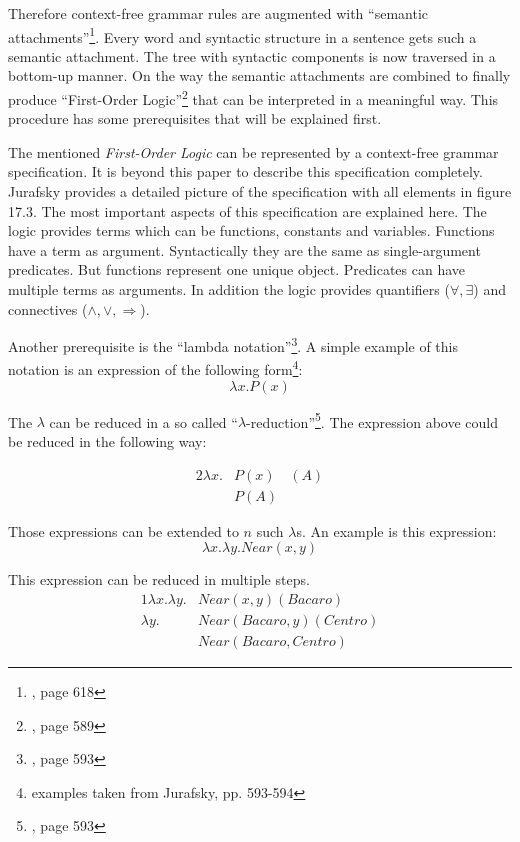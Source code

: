 \documentclass[12pt,twoside]{scrartcl}
\theoremstyle{plain}
\theoremstyle{definition}
\theoremstyle{remark}
\begin{document}
		Therefore context-free grammar rules are augmented with ``semantic attachments''\footnote{\cite{Jurafsky2009}, page 618}. Every word and syntactic structure in a sentence gets such a semantic attachment. The tree with syntactic components is now traversed in a bottom-up manner. On the way the semantic attachments are combined to finally produce ``First-Order Logic''\footnote{\cite{Jurafsky2009a}, page 589} that can be interpreted in a meaningful way. This procedure has some prerequisites that will be explained first.
		
		The mentioned \textit{First-Order Logic} can be represented by a context-free grammar specification. It is beyond this paper to describe this specification completely. Jurafsky\cite{Jurafsky2009a} provides a detailed picture of the specification with all elements in figure 17.3. The most important aspects of this specification are explained here. The logic provides terms which can be functions, constants and variables. Functions have a term as argument. Syntactically they are the same as single-argument predicates. But functions represent one unique object.
		Predicates can have multiple terms as arguments. In addition the logic provides quantifiers ($\forall, \exists$) and connectives ($\wedge, \vee, \Rightarrow$).
		
		Another prerequisite is the ``lambda notation''\footnote{\cite{Jurafsky2009a}, page 593}. A simple example of this notation is an expression of the following form\footnote{examples taken from Jurafsky\cite{Jurafsky2009a}, pp. 593-594}:		
		\[
			\lambda x.P(x)
		\]
		
		The $\lambda$ can be reduced in a so called ``$\lambda$-reduction''\footnote{\cite{Jurafsky2009a}, page 593}. The expression above could be reduced in the following way:
		
		\begin{alignat*}{2}
			\lambda x.&P(x)&(A) \\
			&P(A)&
		\end{alignat*}
		
		Those expressions can be extended to $n$ such $\lambda$s. An example is this expression:
		\[
			\lambda x.\lambda y.Near(x,y)
		\]
				
		This expression can be reduced in multiple steps.
		\begin{alignat*}{1}
			\lambda x.\lambda y.&Near(x,y)(Bacaro) \\
			\lambda y.&Near(Bacaro, y)(Centro) \\
			&Near(Bacaro, Centro)
		\end{alignat*}
				
\end{document}
